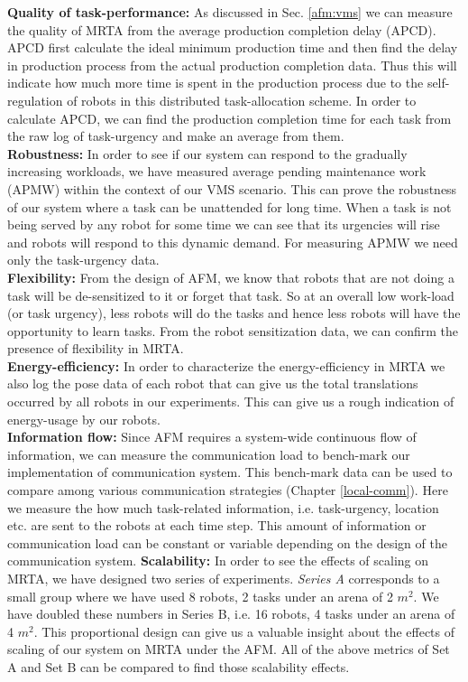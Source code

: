 \textbf{Quality of task-performance:} As discussed in Sec. \ref{afm:vms} we can measure the quality of MRTA from the average production completion delay (APCD). APCD first calculate the ideal minimum production time and then find the delay in production process from the actual production completion data. Thus this will indicate how much more time is  spent in the production process due to the self-regulation of robots in this distributed task-allocation scheme.  In order to calculate APCD, we can find the production completion time for each task from the raw log of task-urgency and make an average from them.\\
\textbf{Robustness:} In order to see if our system can respond to the gradually increasing workloads,  we have measured average pending maintenance work (APMW) within the context of our VMS scenario. This can prove the robustness of our system where a task can be  unattended for long time. When a task is not being served by any robot for some time we can see that its urgencies will rise and robots will respond to this dynamic demand. For measuring APMW we need only the task-urgency data.\\
\textbf{Flexibility:} From the design of AFM, we know that robots that are not doing a task will be de-sensitized to it or forget that task. So at an overall low work-load (or task urgency), less robots will do the tasks and hence less robots will have the opportunity to learn tasks. From the robot sensitization data, we can confirm the presence of flexibility in MRTA.\\
\textbf{Energy-efficiency:} In order to characterize the energy-efficiency in MRTA we also log the pose data of each robot that can give us the total translations occurred by all robots in our experiments. This can give us a rough indication of energy-usage by our robots. \\
\textbf{Information flow:} Since AFM requires a system-wide continuous flow of information, we can measure the communication load to bench-mark our implementation of communication system. This bench-mark data can be used to compare among various communication strategies (Chapter \ref{local-comm}). Here we measure the how much task-related information, i.e. task-urgency, location etc. are sent to the robots at each time step. This  amount of information or communication load can be constant or variable depending on the design of the communication system.
\textbf{Scalability:} In order to see the effects of scaling on MRTA, we have designed two series of experiments. {\em Series A} corresponds to a small group where we have used 8 robots, 2 tasks under an arena of 2 $m^2$. We have doubled these numbers in {Series B}, i.e. 16 robots, 4 tasks under an arena of 4 $m^2$. This proportional design can give us a valuable insight about the effects of scaling of our system on MRTA under the AFM. All of the above metrics of Set A and Set B can be compared to find those scalability effects.\\
